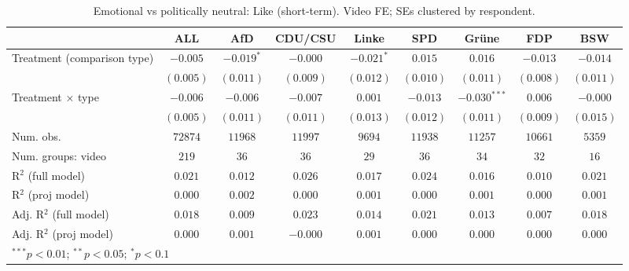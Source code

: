 
\begin{table}
\begin{center}
\begin{tabular}{l c c c c c c c c}
\hline
 & ALL & AfD & CDU/CSU & Linke & SPD & Grüne & FDP & BSW \\
\hline
Treatment (comparison type) & $-0.005$  & $-0.019^{*}$ & $-0.000$  & $-0.021^{*}$ & $0.015$   & $0.016$        & $-0.013$  & $-0.014$  \\
                            & $(0.005)$ & $(0.011)$    & $(0.009)$ & $(0.012)$    & $(0.010)$ & $(0.011)$      & $(0.008)$ & $(0.011)$ \\
Treatment × type            & $-0.006$  & $-0.006$     & $-0.007$  & $0.001$      & $-0.013$  & $-0.030^{***}$ & $0.006$   & $-0.000$  \\
                            & $(0.005)$ & $(0.011)$    & $(0.011)$ & $(0.013)$    & $(0.012)$ & $(0.011)$      & $(0.009)$ & $(0.015)$ \\
\hline
Num. obs.                   & $72874$   & $11968$      & $11997$   & $9694$       & $11938$   & $11257$        & $10661$   & $5359$    \\
Num. groups: video          & $219$     & $36$         & $36$      & $29$         & $36$      & $34$           & $32$      & $16$      \\
R$^2$ (full model)          & $0.021$   & $0.012$      & $0.026$   & $0.017$      & $0.024$   & $0.016$        & $0.010$   & $0.021$   \\
R$^2$ (proj model)          & $0.000$   & $0.002$      & $0.000$   & $0.001$      & $0.000$   & $0.001$        & $0.000$   & $0.001$   \\
Adj. R$^2$ (full model)     & $0.018$   & $0.009$      & $0.023$   & $0.014$      & $0.021$   & $0.013$        & $0.007$   & $0.018$   \\
Adj. R$^2$ (proj model)     & $0.000$   & $0.001$      & $-0.000$  & $0.001$      & $0.000$   & $0.000$        & $0.000$   & $0.000$   \\
\hline
\multicolumn{9}{l}{\scriptsize{$^{***}p<0.01$; $^{**}p<0.05$; $^{*}p<0.1$}}
\end{tabular}
\caption{Emotional vs politically neutral: Like (short-term). Video FE; SEs clustered by respondent.}
\label{tab:compare_emotional_vs_neutral_like}
\end{center}
\end{table}
